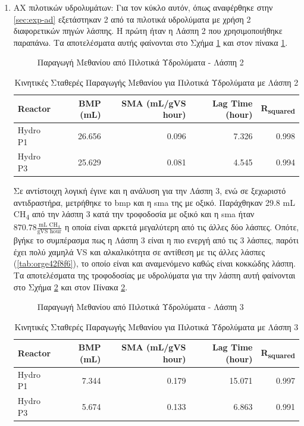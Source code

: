 \documentclass[11pt]{report}
\begin{document}
\begin{enumerate}
\item AX πιλοτικών υδρολυμάτων:
\label{sec:orgebc1042}
Για τον κύκλο αυτόν, όπως αναφέρθηκε στην \autoref{sec:exp-ad} εξετάστηκαν 2 από τα πιλοτικά υδρολύματα με χρήση 2 διαφορετικών πηγών λάσπης. Η πρώτη ήταν η Λάσπη 2 που χρησιμοποιήθηκε παραπάνω. Τα αποτελέσματα αυτής φαίνονται στο Σχήμα \ref{fig:org283e936} και στον πίνακα \ref{tab:org85b3ed0}.

\begin{figure}[htbp]
\centering

\caption{\label{fig:org283e936}Παραγωγή Μεθανίου από Πιλοτικά Υδρολύματα - Λάσπη 2}
\end{figure}

\begin{table}[htbp]
\caption{\label{tab:org85b3ed0}Κινητικές Σταθερές Παραγωγής Μεθανίου για Πιλοτικά Υδρολύματα με Λάσπη 2}
\centering
\begin{tabular}{lrrrr}
Reactor & BMP (mL) & SMA (mL/gVS hour) & Lag Time (hour) & R\textsubscript{squared}\\[0pt]
\hline
Hydro P1 & 26.656 & 0.096 & 7.326 & 0.998\\[0pt]
Hydro P3 & 25.629 & 0.081 & 4.545 & 0.994\\[0pt]
\end{tabular}
\end{table}

Σε αντίστοιχη λογική έγινε και η ανάλυση για την Λάσπη 3, ενώ σε ξεχωριστό αντιδραστήρα, μετρήθηκε το \acrshort{bmp} και η \acrshort{sma} της με οξικό. Παράχθηκαν 29.8 mL CH\textsubscript{4} από την λάσπη 3 κατά την τροφοδοσία με οξικό και η \acrshort{sma} ήταν \(870.78 \frac{\text{mL CH$_4$}}{\text{gVS hour}}\) η οποία είναι αρκετά μεγαλύτερη από τις άλλες δύο λάσπες. Οπότε, βγήκε το συμπέρασμα πως η Λάσπη 3 είναι η πιο ενεργή από τις 3 λάσπες, παρότι έχει πολύ χαμηλά VS και αλκαλικότητα σε αντίθεση με τις άλλες λάσπες (\ref{tab:orge42f8f6}), το οποίο είναι και αναμενόμενο καθώς είναι κοκκώδης λάσπη. Τα αποτελέσματα της τροφοδοσίας με υδρολύματα για την λάσπη αυτή φαίνονται στο Σχήμα \ref{fig:org9995c5a} και στον Πίνακα \ref{tab:orgca176fa}.

\begin{figure}[htbp]
\centering

\caption{\label{fig:org9995c5a}Παραγωγή Μεθανίου από Πιλοτικά Υδρολύματα - Λάσπη 3}
\end{figure}

\begin{table}[htbp]
\caption{\label{tab:orgca176fa}Κινητικές Σταθερές Παραγωγής Μεθανίου για Πιλοτικά Υδρολύματα με Λάσπη 3}
\centering
\begin{tabular}{lrrrr}
Reactor & BMP (mL) & SMA (mL/gVS hour) & Lag Time (hour) & R\textsubscript{squared}\\[0pt]
\hline
Hydro P1 & 7.344 & 0.179 & 15.071 & 0.997\\[0pt]
Hydro P3 & 5.674 & 0.133 & 6.863 & 0.991\\[0pt]
\end{tabular}
\end{table}


\end{enumerate}
\end{document}

